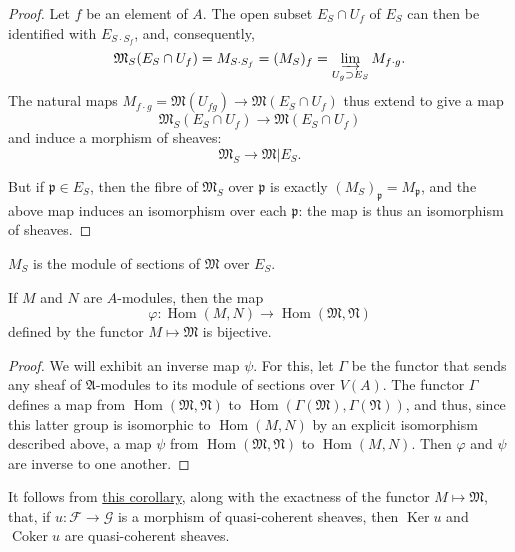 \documentclass{article}
\theoremstyle{plain}
\newenvironment{corollary}[1]
    {\renewcommand\theinnercustomcorollary{#1}\innercustomcorollary}
    {\endinnercustomcorollary}
\theoremstyle{definition}
\newcommand{\sh}[1]{{\mathscr{#1}}}
\DeclareMathOperator{\Hom}{Hom}
\DeclareMathOperator{\Ker}{Ker}
\DeclareMathOperator{\Coker}{Coker}
\newcommand{\oldpage}[1]{\marginpar{\footnotesize$\Big\vert$ \textit{p.~#1}}}
\begin{document}
\begin{proof}
  Let $f$ be an element of $A$.
  The open subset $E_S\cap U_f$ of $E_S$ can then be identified with $E_{S\cdot S_f}$, and, consequently,
  \[
    \mathfrak{M}_S(E_S\cap U_f)
    = M_{S\cdot S_f}
    = (M_S)_f
    = \varinjlim_{U_g\supset E_S}M_{f\cdot g}.
  \]
  The natural maps $M_{f\cdot g}=\mathfrak{M}(U_{fg})\to\mathfrak{M}(E_S\cap U_f)$ thus extend to give a map
  \[
    \mathfrak{M}_S(E_S\cap U_f) \to \mathfrak{M}(E_S\cap U_f)
  \]
  and induce a morphism of sheaves:
  \[
    \mathfrak{M}_S \to \mathfrak{M}|E_S.
  \]

  But if $\mathfrak{p}\in E_S$, then the fibre of $\mathfrak{M}_S$ over $\mathfrak{p}$ is exactly $(M_S)_\mathfrak{p}=M_\mathfrak{p}$, and the above map induces an isomorphism over each $\mathfrak{p}$:
  the map is thus an isomorphism of sheaves.
\end{proof}

\oldpage{1-07}
\begin{corollary}{2}
\label{corollary2}
  $M_S$ is the module of sections of $\mathfrak{M}$ over $E_S$.
\end{corollary}

\begin{corollary}{3}
\label{corollary3}
  If $M$ and $N$ are $A$-modules, then the map \[\varphi\colon\Hom(M,N)\to\Hom(\mathfrak{M},\mathfrak{N})\] defined by the functor $M\mapsto\mathfrak{M}$ is bijective.
\end{corollary}

\begin{proof}
  We will exhibit an inverse map $\psi$.
  For this, let $\Gamma$ be the functor that sends any sheaf of $\mathfrak{A}$-modules to its module of sections over $V(A)$.
  The functor $\Gamma$ defines a map from $\Hom(\mathfrak{M},\mathfrak{N})$ to $\Hom(\Gamma(\mathfrak{M}),\Gamma(\mathfrak{N}))$, and thus, since this latter group is isomorphic to $\Hom(M,N)$ by an explicit isomorphism described above, a map $\psi$ from $\Hom(\mathfrak{M},\mathfrak{N})$ to $\Hom(M,N)$.
  Then $\varphi$ and $\psi$ are inverse to one another.
\end{proof}

It follows from \hyperref[corollary3]{this corollary}, along with the exactness of the functor $M\mapsto\mathfrak{M}$, that, if $u\colon\sh{F}\to\sh{G}$ is a morphism of quasi-coherent sheaves, then $\Ker u$ and $\Coker u$ are quasi-coherent sheaves.
\end{document}
